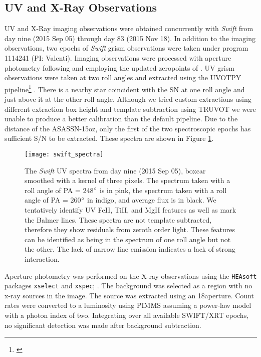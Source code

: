 \documentclass[a4paper,fleqn,usenatbib]{mnras}
\begin{document}
\subsection{UV and X-Ray Observations}\label{SecSwift}
UV and X-Ray imaging observations were obtained concurrently with \textit{Swift} from day nine (2015 Sep 05) through day 83 (2015 Nov 18).
In addition to the imaging observations, two epochs of \textit{Swift} grism observations were taken under program 1114241 (PI: Valenti). 
Imaging observations were processed with aperture photometry following \citet{2009brown} and employing the updated zeropoints of \citet{2010breeveld}.
UV grism observations were taken at two roll angles and extracted using the UVOTPY pipeline\footnote{\citet{2014kuin}} \citep{2015kuin}. 
There is a nearby star coincident with the SN at one roll angle and just above it at the other roll angle.
Although we tried custom extractions using different extraction box height and template subtraction using TRUVOT \citep{2015smitka} we were unable to produce a better calibration than the default pipeline. 
Due to the distance of the ASASSN-15oz, only the first of the two spectroscopic epochs has sufficient S/N to be extracted. 
These spectra are shown in Figure \ref{fig:SwiftSpectrum}.
\begin{figure}
\begin{center}
\texttt{[image: swift\_spectra]} %
\caption{The {\it Swift }UV spectra from day nine (2015 Sep 05), boxcar smoothed with a kernel of three pixels. 
The spectrum taken with a roll angle of PA = 248$\rm{^{\circ}}$ is in pink, the  spectrum taken with a roll angle of PA = 260$\rm{^{\circ}}$ in indigo, and average flux is in black.
We tentatively identify UV FeII, TiII, and MgII features as well as mark the Balmer lines.
These spectra are not template subtracted, therefore they show residuals from zeroth order light. These features can be identified as being in the spectrum of one roll angle but not the other.
The lack of narrow line emission indicates a lack of strong interaction.}
\label{fig:SwiftSpectrum}
\end{center}
\end{figure}

Aperture photometry was performed on the X-ray observations using the  {\tt HEAsoft} packages {\tt xselect} \citep{blackburn_1995} and {\tt xspec}; \citep{arnaud_1996}.
The background was selected as a region with no x-ray sources in the image.
The source was extracted using an 18\arcsec aperture.
Count rates were converted to a luminosity using PIMMS \citep{mukai_1993} assuming a power-law model with a photon index of two.
Integrating over all available SWIFT/XRT epochs, no significant detection was made after background subtraction.
\end{document}
